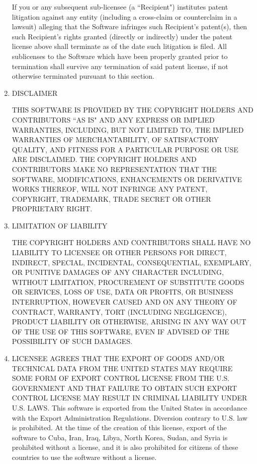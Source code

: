 \begin{enumerate}
   If you or any subsequent sub-licensee (a ``Recipient") institutes
   patent litigation against any entity (including a cross-claim or
   counterclaim in a lawsuit) alleging that the Software infringes
   such Recipient's patent(s), then such Recipient's rights granted
   (directly or indirectly) under the patent license above shall
   terminate as of the date such litigation is filed.  All
   sublicenses to the Software which have been properly granted prior
   to termination shall survive any termination of said patent
   license, if not otherwise terminated pursuant to this section.

\item DISCLAIMER

   THIS SOFTWARE IS PROVIDED BY THE COPYRIGHT HOLDERS AND
   CONTRIBUTORS ``AS IS" AND ANY EXPRESS OR IMPLIED WARRANTIES,
   INCLUDING, BUT NOT LIMITED TO, THE IMPLIED WARRANTIES OF
   MERCHANTABILITY, OF SATISFACTORY QUALITY, AND FITNESS FOR A
   PARTICULAR PURPOSE OR USE ARE DISCLAIMED.  THE COPYRIGHT HOLDERS
   AND CONTRIBUTORS MAKE NO REPRESENTATION THAT THE SOFTWARE,
   MODIFICATIONS, ENHANCEMENTS OR DERIVATIVE WORKS THEREOF, WILL NOT
   INFRINGE ANY PATENT, COPYRIGHT, TRADEMARK, TRADE SECRET OR OTHER
   PROPRIETARY RIGHT.

\item LIMITATION OF LIABILITY

   THE COPYRIGHT HOLDERS AND CONTRIBUTORS SHALL HAVE NO LIABILITY TO
   LICENSEE OR OTHER PERSONS FOR DIRECT, INDIRECT, SPECIAL,
   INCIDENTAL, CONSEQUENTIAL, EXEMPLARY, OR PUNITIVE DAMAGES OF ANY
   CHARACTER INCLUDING, WITHOUT LIMITATION, PROCUREMENT OF SUBSTITUTE
   GOODS OR SERVICES, LOSS OF USE, DATA OR PROFITS, OR BUSINESS
   INTERRUPTION, HOWEVER CAUSED AND ON ANY THEORY OF CONTRACT,
   WARRANTY, TORT (INCLUDING NEGLIGENCE), PRODUCT LIABILITY OR
   OTHERWISE, ARISING IN ANY WAY OUT OF THE USE OF THIS SOFTWARE,
   EVEN IF ADVISED OF THE POSSIBILITY OF SUCH DAMAGES.
   
\item LICENSEE AGREES THAT THE EXPORT OF GOODS AND/OR TECHNICAL DATA
   FROM THE UNITED STATES MAY REQUIRE SOME FORM OF EXPORT CONTROL
   LICENSE FROM THE U.S. GOVERNMENT AND THAT FAILURE TO OBTAIN SUCH
   EXPORT CONTROL LICENSE MAY RESULT IN CRIMINAL LIABILITY UNDER U.S.
   LAWS.  This software is exported from the United States in accordance
   with the Export Administration Regulations. Diversion contrary to
   U.S. law is    prohibited. At the time of the creation of this
   license, export of the software to Cuba, Iran, Iraq, Libya, North
   Korea, Sudan, and Syria is prohibited without a license, and it is
   also prohibited for citizens of these countries to use the
   software without a license.
   

\end{enumerate}
